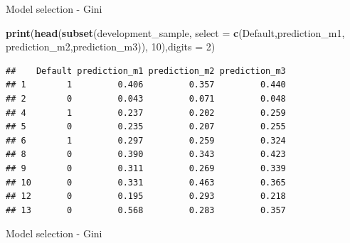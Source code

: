 \documentclass[9pt,ignorenonframetext,]{beamer}
\newenvironment{Shaded}{\begin{snugshade}}{\end{snugshade}}
\newcommand{\KeywordTok}[1]{\textcolor[rgb]{0.13,0.29,0.53}{\textbf{#1}}}
\newcommand{\DataTypeTok}[1]{\textcolor[rgb]{0.13,0.29,0.53}{#1}}
\newcommand{\DecValTok}[1]{\textcolor[rgb]{0.00,0.00,0.81}{#1}}
\newcommand{\StringTok}[1]{\textcolor[rgb]{0.31,0.60,0.02}{#1}}
\newcommand{\OperatorTok}[1]{\textcolor[rgb]{0.81,0.36,0.00}{\textbf{#1}}}
\newcommand{\NormalTok}[1]{#1}
\begin{document}
\begin{frame}[fragile]{Model selection - Gini}

\begin{Shaded}
\begin{Highlighting}[]
\KeywordTok{print}\NormalTok{(}\KeywordTok{head}\NormalTok{(}\KeywordTok{subset}\NormalTok{(development_sample, }\DataTypeTok{select =}
                    \KeywordTok{c}\NormalTok{(Default,prediction_m1,}
\NormalTok{                      prediction_m2,prediction_m3)),}
           \DecValTok{10}\NormalTok{),}\DataTypeTok{digits =} \DecValTok{2}\NormalTok{)}
\end{Highlighting}
\end{Shaded}

\begin{verbatim}
##    Default prediction_m1 prediction_m2 prediction_m3
## 1        1         0.406         0.357         0.440
## 2        0         0.043         0.071         0.048
## 4        1         0.237         0.202         0.259
## 5        0         0.235         0.207         0.255
## 6        1         0.297         0.259         0.324
## 8        0         0.390         0.343         0.423
## 9        0         0.311         0.269         0.339
## 10       0         0.331         0.463         0.365
## 12       0         0.195         0.293         0.218
## 13       0         0.568         0.283         0.357
\end{verbatim}

\end{frame}

\begin{frame}[fragile]{Model selection - Gini}

\begin{Shaded}
\end{Shaded}

\end{frame}
\end{document}
